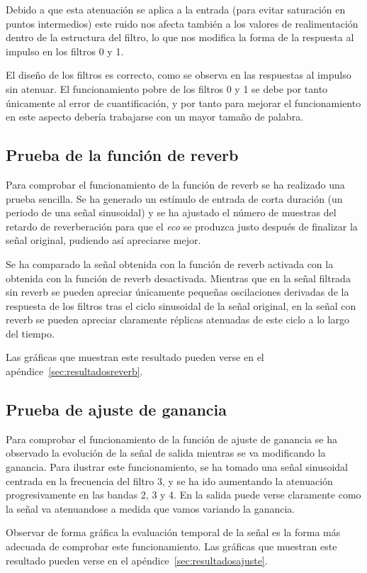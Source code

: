 \documentclass[a4paper,12pt]{article}
\begin{document}
Debido a que esta atenuación se aplica a la entrada (para evitar saturación en puntos intermedios) este ruido nos afecta también a los valores de realimentación dentro de la estructura del filtro, lo que nos modifica la forma de la respuesta al impulso en los filtros 0 y 1.

El diseño de los filtros es correcto, como se observa en las respuestas al impulso sin atenuar. El funcionamiento pobre de los filtros 0 y 1 se debe por tanto únicamente al error de cuantificación, y por tanto para mejorar el funcionamiento en este aspecto debería trabajarse con un mayor tamaño de palabra.


\subsection{Prueba de la función de reverb}
Para comprobar el funcionamiento de la función de reverb se ha realizado una prueba sencilla. Se ha generado un estímulo de entrada de corta duración (un periodo de una señal sinusoidal) y se ha ajustado el número de muestras del retardo de reverberación para que el \emph{eco} se produzca justo después de finalizar la señal original, pudiendo así apreciarse mejor.

Se ha comparado la señal obtenida con la función de reverb activada con la obtenida con la función de reverb desactivada. Mientras que en la señal filtrada sin reverb se pueden apreciar únicamente pequeñas oscilaciones derivadas de la respuesta de los filtros tras el ciclo sinusoidal de la señal original, en la señal con reverb se pueden apreciar claramente réplicas atenuadas de este ciclo a lo largo del tiempo.

Las gráficas que muestran este resultado pueden verse en el apéndice~\ref{sec:resultadosreverb}.


\subsection{Prueba de ajuste de ganancia}
Para comprobar el funcionamiento de la función de ajuste de ganancia se ha observado la evolución de la señal de salida mientras se va modificando la ganancia. Para ilustrar este funcionamiento, se ha tomado una señal sinusoidal centrada en la frecuencia del filtro 3, y se ha ido aumentando la atenuación progresivamente en las bandas 2, 3 y 4. En la salida puede verse claramente como la señal va atenuandose a medida que vamos variando la ganancia.

Observar de forma gráfica la evaluación temporal de la señal es la forma más adecuada de comprobar este funcionamiento. Las gráficas que muestran este resultado pueden verse en el apéndice~\ref{sec:resultadosajuste}.
\end{document}
